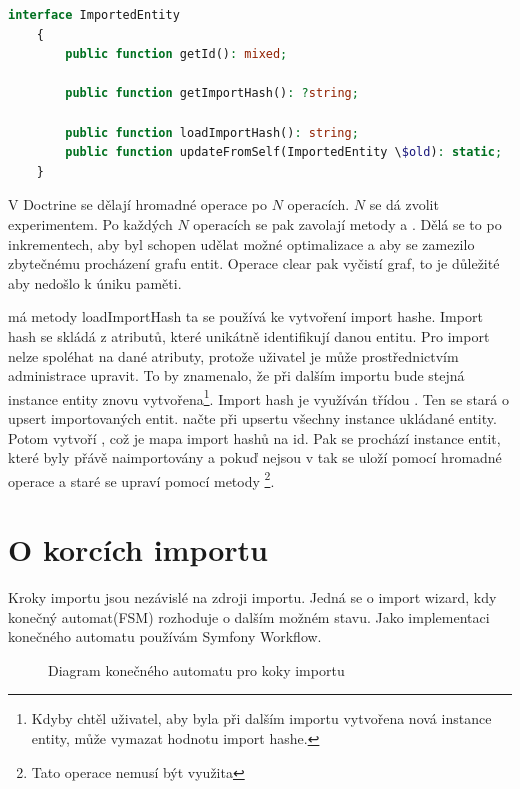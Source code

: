\begin{lstlisting}[language=PHP, caption={Zdrojový kód \codename{ImportedEntity}}]
    interface ImportedEntity
    {
        public function getId(): mixed;
    
        public function getImportHash(): ?string;   

        public function loadImportHash(): string;   
        public function updateFromSelf(ImportedEntity \$old): static;
    }
\end{lstlisting}

V Doctrine se dělají hromadné operace po $N$ operacích. $N$ se dá zvolit experimentem.
Po každých $N$ operacích se pak zavolají metody  a . Dělá se to po inkrementech, aby  byl schopen udělat možné optimalizace a aby se zamezilo zbytečnému procházení grafu entit. Operace clear pak vyčistí graf, to je důležité aby nedošlo k úniku paměti.

 má metody loadImportHash ta se používá ke vytvoření import hashe. Import hash se skládá z atributů, které unikátně identifikují danou entitu. Pro import nelze spoléhat na dané atributy, protože uživatel je může prostřednictvím administrace upravit. To by znamenalo, že při dalším importu bude stejná instance entity znovu vytvořena\footnote{Kdyby chtěl uživatel, aby byla při dalším importu vytvořena nová instance entity, může vymazat hodnotu import hashe.}.
Import hash je využíván třídou . Ten se stará o upsert importovaných entit.
 načte při upsertu všechny instance ukládané entity.
Potom vytvoří , což je mapa import hashů na id.
Pak se prochází instance entit, které byly přávě naimportovány a pokuď nejsou v  tak se uloží pomocí hromadné operace a staré  se upraví pomocí metody \footnote{Tato operace nemusí být využita}.


\section{O korcích importu}

Kroky importu jsou nezávislé na zdroji importu. 
Jedná se o import wizard, kdy konečný automat(FSM) rozhoduje o dalším možném stavu. 
Jako implementaci konečného automatu používám Symfony Workflow.

\begin{figure}
	\centering
  
  \caption{Diagram konečného automatu pro koky importu}
\end{figure}

